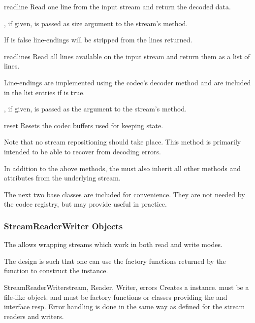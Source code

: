 \begin{methoddesc}{readline}{}
  Read one line from the input stream and return the
  decoded data.

  , if given, is passed as size argument to the stream's
   method.

  If  is false line-endings will be stripped from the
  lines returned.

\end{methoddesc}

\begin{methoddesc}{readlines}{}
  Read all lines available on the input stream and return them as a list
  of lines.

  Line-endings are implemented using the codec's decoder method and are
  included in the list entries if  is true.

  , if given, is passed as the  argument to the
  stream's  method.
\end{methoddesc}

\begin{methoddesc}{reset}{}
  Resets the codec buffers used for keeping state.

  Note that no stream repositioning should take place.  This method is
  primarily intended to be able to recover from decoding errors.
\end{methoddesc}

In addition to the above methods, the  must also
inherit all other methods and attributes from the underlying stream.

The next two base classes are included for convenience. They are not
needed by the codec registry, but may provide useful in practice.


\subsubsection{StreamReaderWriter Objects \label{stream-reader-writer}}

The  allows wrapping streams which work in
both read and write modes.

The design is such that one can use the factory functions returned by
the  function to construct the instance.

\begin{classdesc}{StreamReaderWriter}{stream, Reader, Writer, errors}
  Creates a  instance.
   must be a file-like object.
   and  must be factory functions or classes
  providing the  and  interface
  resp.
  Error handling is done in the same way as defined for the
  stream readers and writers.
\end{classdesc}

